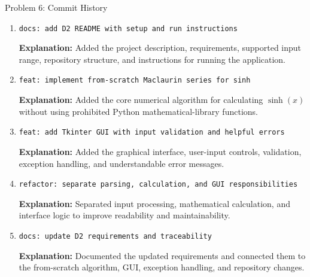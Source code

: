 \documentclass[aspectratio=169,11pt]{beamer}
\begin{document}

\begin{frame}[t]{Problem 6: Commit History}
\scriptsize

\begin{enumerate}

\item
\texttt{docs: add D2 README with setup and run instructions}

\textbf{Explanation:}
Added the project description, requirements, supported input range,
repository structure, and instructions for running the application.

\vspace{0.15cm}

\item
\texttt{feat: implement from-scratch Maclaurin series for sinh}

\textbf{Explanation:}
Added the core numerical algorithm for calculating $\sinh(x)$ without
using prohibited Python mathematical-library functions.

\vspace{0.15cm}

\item
\texttt{feat: add Tkinter GUI with input validation and helpful errors}

\textbf{Explanation:}
Added the graphical interface, user-input controls, validation,
exception handling, and understandable error messages.

\vspace{0.15cm}

\item
\texttt{refactor: separate parsing, calculation, and GUI responsibilities}

\textbf{Explanation:}
Separated input processing, mathematical calculation, and interface
logic to improve readability and maintainability.

\vspace{0.15cm}

\item
\texttt{docs: update D2 requirements and traceability}

\textbf{Explanation:}
Documented the updated requirements and connected them to the
from-scratch algorithm, GUI, exception handling, and repository changes.

\end{enumerate}
\end{frame}
\end{document}
